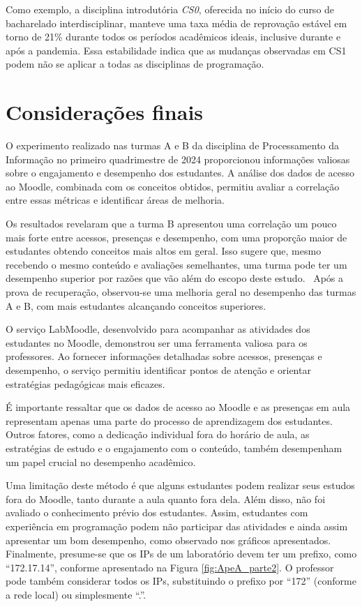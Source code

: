 Como exemplo, a disciplina introdutória \textit{CS0}, oferecida no início do curso de bacharelado interdisciplinar, manteve uma taxa média de reprovação estável em torno de 21\% durante todos os períodos acadêmicos ideais, inclusive durante e após a pandemia. Essa estabilidade indica que as mudanças observadas em CS1 podem não se aplicar a todas as disciplinas de programação.


\section{Considerações finais}

O experimento realizado nas turmas A e B da disciplina de Processamento da Informação no primeiro quadrimestre de 2024 proporcionou informações valiosas sobre o engajamento e desempenho dos estudantes. A análise dos dados de acesso ao Moodle, combinada com os conceitos obtidos, permitiu avaliar a correlação entre essas métricas e identificar áreas de melhoria.

Os resultados revelaram que a turma B apresentou uma correlação um pouco mais forte entre acessos, presenças e desempenho, com uma proporção maior de estudantes obtendo conceitos mais altos em geral. Isso sugere que, mesmo recebendo o mesmo conteúdo e avaliações semelhantes, uma turma pode ter um desempenho superior por razões que vão além do escopo deste estudo.
\
Após a prova de recuperação, observou-se uma melhoria geral no desempenho das turmas A e B, com mais estudantes alcançando conceitos superiores. 

O serviço LabMoodle, desenvolvido para acompanhar as atividades dos estudantes no Moodle, demonstrou ser uma ferramenta valiosa para os professores. Ao fornecer informações detalhadas sobre acessos, presenças e desempenho, o serviço permitiu identificar pontos de atenção e orientar estratégias pedagógicas mais eficazes.

É importante ressaltar que os dados de acesso ao Moodle e as presenças em aula representam apenas uma parte do processo de aprendizagem dos estudantes. Outros fatores, como a dedicação individual fora do horário de aula, as estratégias de estudo e o engajamento com o conteúdo, também desempenham um papel crucial no desempenho acadêmico.

Uma limitação deste método é que alguns estudantes podem realizar seus estudos fora do Moodle, tanto durante a aula quanto fora dela. Além disso, não foi avaliado o conhecimento prévio dos estudantes. Assim, estudantes com experiência em programação podem não participar das atividades e ainda assim apresentar um bom desempenho, como observado nos gráficos apresentados. Finalmente, presume-se que os IPs de um laboratório devem ter um prefixo, como ``172.17.14'', conforme apresentado na Figura \ref{fig:ApeA_parte2}. O professor pode também considerar todos os IPs, substituindo o prefixo por ``172'' (conforme a rede local) ou simplesmente ``.''.

